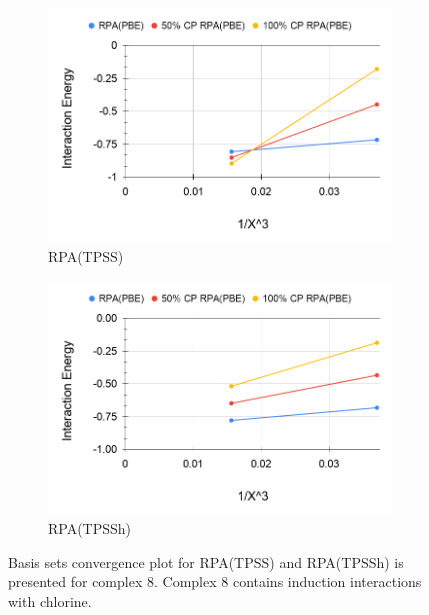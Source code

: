 \documentclass[11pt]{article}
\begin{document}
\begin{figure}[hbpt]
  \centering
  \begin{subfigure}{.5\textwidth}
    \centering
    \includegraphics[scale=0.3]{tpss-8.png}
    \caption{RPA(TPSS)}
    \label{fig:tpss_8}
  \end{subfigure}%
  \begin{subfigure}{.5\textwidth}
    \centering
    \includegraphics[scale=0.3]{tpssh-8.png}
    \caption{RPA(TPSSh)}
    \label{fig:tpssh_8}
  \end{subfigure}
  \caption{Basis sets convergence plot for RPA(TPSS) and RPA(TPSSh) is
    presented for complex 8. Complex 8 contains induction interactions
    with chlorine.}
  \label{fig:complex_8}
\end{figure}
\end{document}
